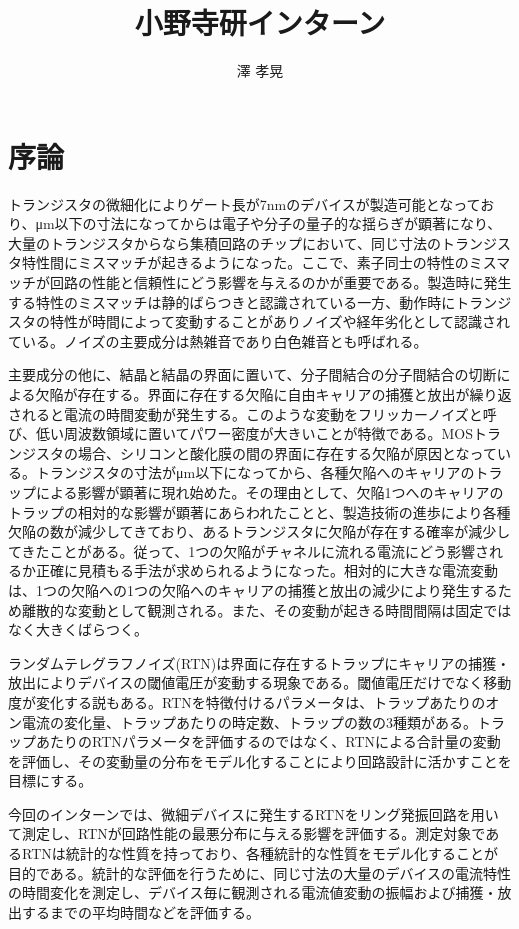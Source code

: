 \documentclass{jsarticle}
\begin{document}
\title{小野寺研インターン}
\author{澤 孝晃}
\maketitle

\section{序論}

トランジスタの微細化によりゲート長が7nmのデバイスが製造可能となっており、μm以下の寸法になってからは電子や分子の量子的な揺らぎが顕著になり、大量のトランジスタからなら集積回路のチップにおいて、同じ寸法のトランジスタ特性間にミスマッチが起きるようになった。ここで、素子同士の特性のミスマッチが回路の性能と信頼性にどう影響を与えるのかが重要である。製造時に発生する特性のミスマッチは静的ばらつきと認識されている一方、動作時にトランジスタの特性が時間によって変動することがありノイズや経年劣化として認識されている。ノイズの主要成分は熱雑音であり白色雑音とも呼ばれる。

主要成分の他に、結晶と結晶の界面に置いて、分子間結合の分子間結合の切断による欠陥が存在する。界面に存在する欠陥に自由キャリアの捕獲と放出が繰り返されると電流の時間変動が発生する。このような変動をフリッカーノイズと呼び、低い周波数領域に置いてパワー密度が大きいことが特徴である。MOSトランジスタの場合、シリコンと酸化膜の間の界面に存在する欠陥が原因となっている。トランジスタの寸法がμm以下になってから、各種欠陥へのキャリアのトラップによる影響が顕著に現れ始めた。その理由として、欠陥1つへのキャリアのトラップの相対的な影響が顕著にあらわれたことと、製造技術の進歩により各種欠陥の数が減少してきており、あるトランジスタに欠陥が存在する確率が減少してきたことがある。従って、1つの欠陥がチャネルに流れる電流にどう影響されるか正確に見積もる手法が求められるようになった。相対的に大きな電流変動は、1つの欠陥への1つの欠陥へのキャリアの捕獲と放出の減少により発生するため離散的な変動として観測される。また、その変動が起きる時間間隔は固定ではなく大きくばらつく。

ランダムテレグラフノイズ(RTN)は界面に存在するトラップにキャリアの捕獲・放出によりデバイスの閾値電圧が変動する現象である。閾値電圧だけでなく移動度が変化する説もある。RTNを特徴付けるパラメータは、トラップあたりのオン電流の変化量、トラップあたりの時定数、トラップの数の3種類がある。トラップあたりのRTNパラメータを評価するのではなく、RTNによる合計量の変動を評価し、その変動量の分布をモデル化することにより回路設計に活かすことを目標にする。

今回のインターンでは、微細デバイスに発生するRTNをリング発振回路を用いて測定し、RTNが回路性能の最悪分布に与える影響を評価する。測定対象であるRTNは統計的な性質を持っており、各種統計的な性質をモデル化することが目的である。統計的な評価を行うために、同じ寸法の大量のデバイスの電流特性の時間変化を測定し、デバイス毎に観測される電流値変動の振幅および捕獲・放出するまでの平均時間などを評価する。
\end{document}
